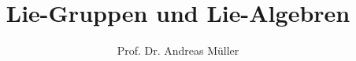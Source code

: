 %
%
%


\beamertemplatenavigationsymbolsempty
\title[Lie]{Lie-Gruppen und Lie-Algebren}
\author[A.~Müller]{Prof. Dr. Andreas Müller}
\date[]{}

